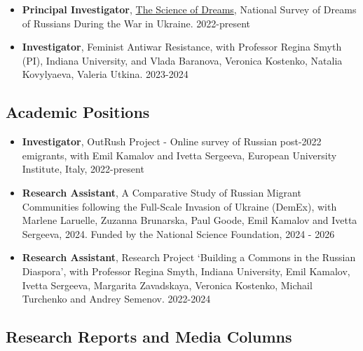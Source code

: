\documentclass[
]{article}
\providecommand{\tightlist}{%
  \setlength{\itemsep}{0pt}\setlength{\parskip}{0pt}}
\begin{document}
\begin{itemize}
\begin{itemize}
{    (DE)},
    \href{https://www.information.dk/udland/2023/02/stoerste-brain-drain-30-aar-ressourcestaerke-russere-antonina-startet-nyt-liv-udlandet}{Information (DA)},
    \href{https://www.cdt.ch/news/erano-scappati-dalla-guerra-ora-stanno-tornando-a-casa-331807}{Corriere Del Ticino (ES)},
    \href{https://www.ceskenoviny.cz/zpravy/rusove-kteri-po-unoru-odjeli-z-vlasti-zacali-podle-pruzkumu-vice-verit-lidem/2302793}{Ceske Noviny (CS)},
    \href{https://spravy.pravda.sk/svet/clanok/651763-rusi-ktori-po-februari-odisli-z-vlasti-zacali-podla-prieskumu-viac-verit-ludom/}{Pravda
    (SK)}
  \end{itemize}
\item
  \textbf{Principal Investigator},
  \href{https://readymag.website/u94255285/wardreams/2/}{The Science of
  Dreams}, National Survey of Dreams of Russians During the War in
  Ukraine. 2022-present
\item
  \textbf{Investigator}, Feminist Antiwar Resistance, with Professor
  Regina Smyth (PI), Indiana University, and Vlada Baranova, Veronica
  Kostenko, Natalia Kovylyaeva, Valeria Utkina. 2023-2024
\end{itemize}

\hypertarget{academic-positions}{%
\subsection{Academic Positions}\label{academic-positions}}

\begin{itemize}
\tightlist
\item
  \textbf{Investigator}, OutRush Project - Online survey of Russian
  post-2022 emigrants, with Emil Kamalov and Ivetta Sergeeva, European
  University Institute, Italy, 2022-present
\item
  \textbf{Research Assistant}, A Comparative Study of Russian Migrant
  Communities following the Full-Scale Invasion of Ukraine (DemEx), with
  Marlene Laruelle, Zuzanna Brunarska, Paul Goode, Emil Kamalov and
  Ivetta Sergeeva, 2024. Funded by the National Science Foundation, 2024
  - 2026
\item
  \textbf{Research Assistant}, Research Project `Building a Commons in
  the Russian Diaspora', with Professor Regina Smyth, Indiana
  University, Emil Kamalov, Ivetta Sergeeva, Margarita Zavadskaya,
  Veronica Kostenko, Michail Turchenko and Andrey Semenov. 2022-2024
\end{itemize}

\hypertarget{research-reports-and-media-columns}{%
\subsection{Research Reports and Media
Columns}\label{research-reports-and-media-columns}}
\end{document}
